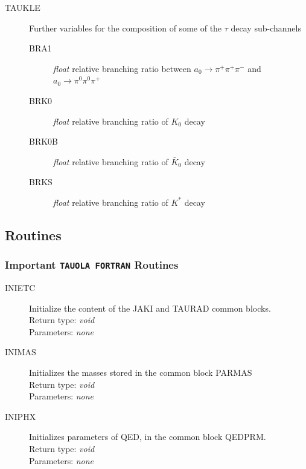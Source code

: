 \documentclass[]{Tauola_interface_design}
\begin{document}
\begin{description}
\item[TAUKLE]  Further variables for the composition of some of the $\tau$ decay sub-channels
  \begin{description}
  \item[BRA1] \textit{float} relative branching ratio between  $a_0 \to \pi^+\pi^+\pi^-$ and $a_0 \to \pi^0\pi^0\pi^+$
  \item[BRK0] \textit{float} relative branching ratio of $ K_0$ decay
  \item[BRK0B] \textit{float} relative branching ratio of $\bar K_0$ decay
  \item[BRKS] \textit{float} relative branching ratio of $ K^*$ decay
  \end{description}
\end{description}  

\subsection{Routines}
\label{subsubsec:routines}

\subsubsection{Important {\tt TAUOLA FORTRAN} Routines}
  
\begin{description}
\item[INIETC] Initialize the content of the JAKI and TAURAD common blocks. \\
  Return type: \textit{void} \\
  Parameters: \textit{none}

\end{description}

\begin{description}
\item[INIMAS] Initializes the masses stored in the common block PARMAS \\
  Return type: \textit{void} \\
  Parameters: \textit{none}
\end{description}

\begin{description}
\item[INIPHX] Initializes parameters of QED, in the common block QEDPRM. \\
  Return type: \textit{void} \\
  Parameters: \textit{none}

\end{description}
\end{document}
